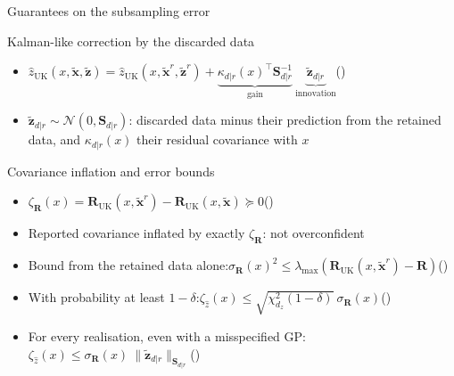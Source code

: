 \documentclass[9pt]{beamer}
\begin{document}
\begin{frame}{Guarantees on the subsampling error}

\begin{block}{Kalman-like correction by the discarded data}
	\begin{itemize}
	\item\hfill$\hat{z}_{\mathrm{UK}}(x,\tilde{\mathbf{x}},\tilde{\mathbf{z}})=\hat{z}_{\mathrm{UK}}(x,\tilde{\mathbf{x}}^r,\tilde{\mathbf{z}}^r)+\underbrace{\kappa_{d|r}(x)^\top\mathbf{S}_{d|r}^{-1}}_{\text{gain}}\:\underbrace{\tilde{\mathbf{z}}_{d|r}}_{\text{innovation}}$\hfill{}(\theequation)
	\item $\tilde{\mathbf{z}}_{d|r}\sim\mathcal{N}(0,\mathbf{S}_{d|r})$: discarded data minus their prediction from the retained data, and $\kappa_{d|r}(x)$ their residual covariance with $x$
	\end{itemize}
\end{block}

\begin{block}{Covariance inflation and error bounds}
	\begin{itemize}
	\item\hfill$\zeta_{\mathbf{R}}(x)=\mathbf{R}_{\mathrm{UK}}(x,\tilde{\mathbf{x}}^r)-\mathbf{R}_{\mathrm{UK}}(x,\tilde{\mathbf{x}})\succeq0$\hfill{}(\theequation)
	\item[$\Rightarrow$] Reported covariance inflated by exactly $\zeta_{\mathbf{R}}$: not overconfident
	\item Bound from the retained data alone:\hfill$\sigma_{\mathbf{R}}(x)^2\leq\lambda_{\max}\left(\mathbf{R}_{\mathrm{UK}}(x,\tilde{\mathbf{x}}^r)-\mathbf{R}\right)$\hfill{}(\theequation)
	\item With probability at least $1-\delta$:\hfill$\zeta_{\hat{z}}(x)\leq\sqrt{\chi^2_{d_z}(1-\delta)}\:\sigma_{\mathbf{R}}(x)$\hfill{}(\theequation)
	\item For every realisation, even with a misspecified GP:\\
	\hfill$\zeta_{\hat{z}}(x)\leq\sigma_{\mathbf{R}}(x)\:\|\tilde{\mathbf{z}}_{d|r}\|_{\mathbf{S}_{d|r}}$\hfill{}(\theequation)
	\end{itemize}
\end{block}

\end{frame}

\begin{frame}

\end{frame}
\end{document}
